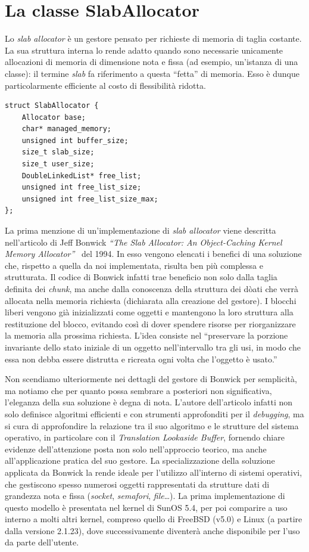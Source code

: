 
\section{La classe SlabAllocator}
Lo \textit{slab allocator} è un gestore pensato per richieste di memoria di taglia costante. La sua struttura interna lo rende adatto quando sono necessarie unicamente allocazioni di memoria di dimensione nota e fissa (ad esempio, un'istanza di una classe): il termine \textit{slab} fa riferimento a questa “fetta” di memoria. Esso è dunque particolarmente efficiente al costo di flessibilità ridotta.

\begin{lstlisting}
struct SlabAllocator {
    Allocator base;
    char* managed_memory;
    unsigned int buffer_size;
    size_t slab_size;   
    size_t user_size;
    DoubleLinkedList* free_list;   
    unsigned int free_list_size;
    unsigned int free_list_size_max;
};
\end{lstlisting}

La prima menzione di un’implementazione di \textit{slab allocator} viene descritta nell’articolo di Jeff Bonwick \textit{“The Slab Allocator: An Object-Caching Kernel Memory Allocator”}~\cite{slab} del 1994. In esso vengono elencati i benefici di una soluzione che, rispetto a quella da noi implementata, risulta ben più complessa e strutturata. Il codice di Bonwick infatti trae beneficio non solo dalla taglia definita dei \textit{chunk}, ma anche dalla conoscenza della struttura dei dòati che verrà allocata nella memoria richiesta (dichiarata alla creazione del gestore). I blocchi liberi vengono già inizializzati come oggetti e mantengono la loro struttura alla restituzione del blocco, evitando così di dover spendere risorse per riorganizzare la memoria alla prossima richiesta. L’idea consiste nel “preservare la porzione invariante dello stato iniziale di un oggetto nell’intervallo tra gli usi, in modo che essa non debba essere distrutta e ricreata ogni volta che l’oggetto è usato.”

Non scendiamo ulteriormente nei dettagli del gestore di Bonwick per semplicità, ma notiamo che per quanto possa sembrare a posteriori non significativa, l’eleganza della sua soluzione è degna di nota. L’autore dell’articolo infatti non solo definisce algoritmi efficienti e con strumenti approfonditi per il \textit{debugging}, ma si cura di approfondire la relazione tra il suo algoritmo e le strutture del sistema operativo, in particolare con il \textit{Translation Lookaside Buffer}, fornendo chiare evidenze dell’attenzione posta non solo nell’approccio teorico, ma anche all’applicazione pratica del suo gestore. La specializzazione della soluzione applicata da Bonwick la rende ideale per l’utilizzo all’interno di sistemi operativi, che gestiscono spesso numerosi oggetti rappresentati da strutture dati di grandezza nota e fissa (\textit{socket}, \textit{semafori}, \textit{file}…). La prima implementazione di questo modello è presentata nel kernel di SunOS 5.4, per poi comparire a uso interno a molti altri kernel, compreso quello di FreeBSD (v5.0) e Linux (a partire dalla versione 2.1.23), dove successivamente diventerà anche disponibile per l’uso da parte dell’utente.

